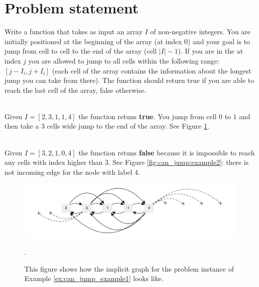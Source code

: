 \section{Problem statement}
\begin{exercise}
Write a function that takes as input  an array $I$ of non-negative integers. You are initially
positioned at the beginning of the array (at index $0$) and your goal is to jump from cell to cell
to the end of the array (cell $|I|-1$). If you are in the at index $j$ you are allowed to jump to
all cells within the following range: $[j-I_i,j+I_i]$ (each cell of the array contains the
information about the longest jump you can take from there). The function should return true if you
are able to reach the last cell of the array, false otherwise.

	\begin{example}
		\hfill \\
		Given  $I=[2,3,1,1,4]$ the function retuns \textbf{true}. You jump from cell $0$ to $1$ and
		then take a $3$ cells wide jump to the end of the array. See Figure \ref{fig:can_jump:example1}.
		\label{ex:can_jump_example1}
	\end{example}

	\begin{example}
		\hfill \\
		Given $I=[3,2,1,0,4]$ the function retuns \textbf{false} because it is impossible to reach
		any cells with index higher than $3$. See Figure \ref{fig:can_jump:example2}: there is not incoming edge for the node with label $4$.
		\label{ex:can_jump_example2}
	\end{example}
\end{exercise}

\begin{figure}
	\centering
	\includegraphics[width=\textwidth]{sources/can_jump/images/can_jump_example1}
	\caption[Implicit graph for the Example \ref{ex:can_jump_example1}.]
	{This figure shows how the implicit graph for the problem instance of Example \ref{ex:can_jump_example1} looks like.}.
	\label{fig:can_jump:example1}
\end{figure}

